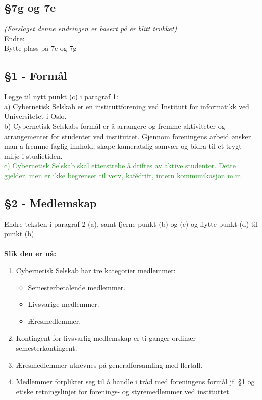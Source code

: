 \documentclass[10pt,norsk,a4paper,usenames,dvipsnames]{article}
\begin{document}
    \subsection{§7g og 7e}
    
        \small\textit{(Forslaget denne endringen er basert på er blitt trukket)}\\\normalsize
        Endre:
        \\Bytte plass på 7e og 7g
        
    
    \subsection{§1 - Formål}
        Legge til nytt punkt (c) i paragraf 1:
        \\a) Cybernetisk Selskab er en instituttforening ved Institutt for informatikk ved Universitetet i Oslo.
        \\b) Cybernetisk Selskabs formål er å arrangere og fremme aktiviteter og arrangementer for studenter ved instituttet. Gjennom foreningens arbeid ønsker man å fremme faglig innhold, skape kameratslig samvær og bidra til et trygt miljø i studietiden.
        \\\textcolor{ForestGreen}{c) Cybernetisk Selskab skal etterstrebe å driftes av aktive studenter. Dette gjelder, men er ikke begrenset til verv, kafédrift, intern kommunikasjon m.m.}
        
    
    \subsection{§2 - Medlemskap}
        Endre teksten i paragraf 2 (a), samt fjerne punkt (b) og (c) og flytte punkt (d) til punkt (b)
        \\\\\textbf{Slik den er nå:}
        \begin{enumerate} 
        	\item{Cybernetisk Selskab har tre kategorier medlemmer:}
        	\begin{itemize}
        		\item{Semesterbetalende medlemmer.}
        		\item{Livsvarige medlemmer.}
        		\item{Æresmedlemmer.}
        	\end{itemize}
        	\item{Kontingent for livsvarlig medlemskap er ti ganger ordinær semesterkontingent.}
        	\item{Æresmedlemmer utnevnes på generalforsamling med  flertall.}
        	\item Medlemmer forplikter seg til å handle i tråd med foreningens formål jf. §1 og etiske retningslinjer for forenings- og styremedlemmer ved instituttet.\\
        \end{enumerate}
        
\end{document}

